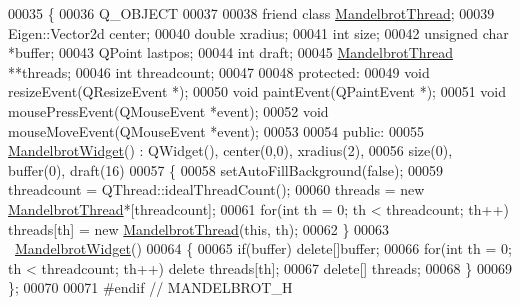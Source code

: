 \begin{DoxyCode}
00035 \{
00036     Q\_OBJECT
00037 
00038     \textcolor{keyword}{friend} \textcolor{keyword}{class }\hyperlink{class_mandelbrot_thread}{MandelbrotThread};
00039     Eigen::Vector2d center;
00040     \textcolor{keywordtype}{double} xradius;
00041     \textcolor{keywordtype}{int} size;
00042     \textcolor{keywordtype}{unsigned} \textcolor{keywordtype}{char} *buffer;
00043     QPoint lastpos;
00044     \textcolor{keywordtype}{int} draft;
00045     \hyperlink{class_mandelbrot_thread}{MandelbrotThread} **threads;
00046     \textcolor{keywordtype}{int} threadcount;
00047 
00048   \textcolor{keyword}{protected}:
00049     \textcolor{keywordtype}{void} resizeEvent(QResizeEvent *);
00050     \textcolor{keywordtype}{void} paintEvent(QPaintEvent *);
00051     \textcolor{keywordtype}{void} mousePressEvent(QMouseEvent *event);
00052     \textcolor{keywordtype}{void} mouseMoveEvent(QMouseEvent *event);
00053 
00054   \textcolor{keyword}{public}:
00055     \hyperlink{class_mandelbrot_widget}{MandelbrotWidget}() : QWidget(), center(0,0), xradius(2),
00056                          size(0), buffer(0), draft(16)
00057     \{
00058       setAutoFillBackground(\textcolor{keyword}{false});
00059       threadcount = QThread::idealThreadCount();
00060       threads = \textcolor{keyword}{new} \hyperlink{class_mandelbrot_thread}{MandelbrotThread}*[threadcount];
00061       \textcolor{keywordflow}{for}(\textcolor{keywordtype}{int} th = 0; th < threadcount; th++) threads[th] = \textcolor{keyword}{new} \hyperlink{class_mandelbrot_thread}{MandelbrotThread}(\textcolor{keyword}{this}, th);
00062     \}
00063     ~\hyperlink{class_mandelbrot_widget}{MandelbrotWidget}()
00064     \{
00065       \textcolor{keywordflow}{if}(buffer) \textcolor{keyword}{delete}[]buffer;
00066       \textcolor{keywordflow}{for}(\textcolor{keywordtype}{int} th = 0; th < threadcount; th++) \textcolor{keyword}{delete} threads[th];
00067       \textcolor{keyword}{delete}[] threads;
00068     \}
00069 \};
00070 
00071 \textcolor{preprocessor}{#endif // MANDELBROT\_H}
\end{DoxyCode}
